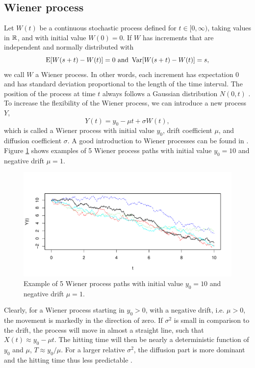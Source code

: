 \subsection{Wiener process}
Let $W(t)$ be a continuous stochastic process defined for $t\in[0,\infty)$, taking values in $\mathbb{R}$, and with initial value $W(0)=0$. If $W$ has increments that are independent and normally distributed with
\begin{equation*}
    \operatorname{E}[W(s+t)-W(t)]=0\text{   and   }\operatorname{Var}[W(s+t)-W(t)]=s,
\end{equation*}
we call $W$ a Wiener process. In other words, each increment has expectation 0 and has standard deviation proportional to the length of the time interval. The position of the process at time $t$ always follows a Gaussian distribution $N(0, t)$ \citep{ABG}. To increase the flexibility of the Wiener process, we can introduce a new process $Y$,
\begin{equation}\label{wiener}
    Y(t)=y_0-\mu t+\sigma W(t),
\end{equation}
which is called a Wiener process with initial value $y_0$, drift coefficient $\mu$, and diffusion coefficient $\sigma$. A good introduction to Wiener processes can be found in \citet{cox1965}. Figure \ref{plot:wiener} shows examples of 5 Wiener process paths with initial value $y_0=10$ and negative drift $\mu=1$.
\begin{figure}[H]
\label{plot:wiener}
\caption{Example of 5 Wiener process paths with initial value $y_0=10$ and negative drift $\mu=1$.}
\centering
\includegraphics[scale=0.4]{figures/wiener_processes.pdf}
\end{figure}
\noindent{}Clearly, for a Wiener process starting in $y_0>0$, with a negative drift, i.e. $\mu>0$, the movement is markedly in the direction of zero. If $\sigma^2$ is small in comparison to the drift, the process will move in almost a straight line, such that $X(t)\approx y_0-\mu t$. The hitting time will then be nearly a deterministic function of $y_0$ and $\mu$, $T\approx y_0/\mu$. For a larger relative $\sigma^2$, the diffusion part is more dominant and the hitting time thus less predictable \citep{ABG}.

